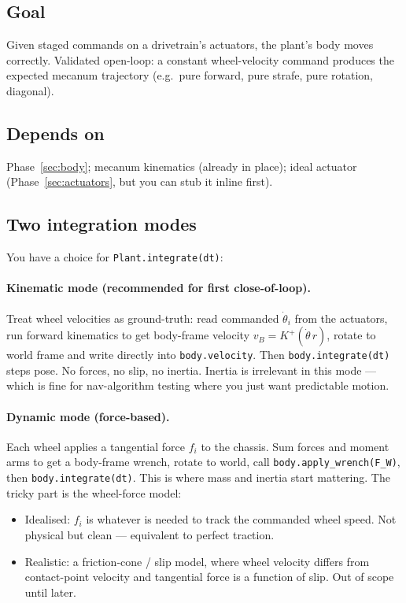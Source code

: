 \documentclass[11pt,a4paper]{article}
\newcommand{\code}[1]{\texttt{\small #1}}
\begin{document}
\subsection*{Goal}
Given staged commands on a drivetrain's actuators, the plant's body moves
correctly. Validated open-loop: a constant wheel-velocity command produces
the expected mecanum trajectory (e.g.\ pure forward, pure strafe, pure
rotation, diagonal).

\subsection*{Depends on}
Phase~\ref{sec:body}; mecanum kinematics (already in place); ideal actuator
(Phase~\ref{sec:actuators}, but you can stub it inline first).

\subsection*{Two integration modes}

You have a choice for \code{Plant.integrate(dt)}:

\paragraph{Kinematic mode (recommended for first close-of-loop).}
Treat wheel velocities as ground-truth: read commanded $\dot\theta_i$ from
the actuators, run forward kinematics to get body-frame velocity
$v_B = K^+ (\dot\theta\, r)$, rotate to world frame and write directly into
\code{body.velocity}. Then \code{body.integrate(dt)} steps pose. No forces,
no slip, no inertia. Inertia is irrelevant in this mode --- which is fine
for nav-algorithm testing where you just want predictable motion.

\paragraph{Dynamic mode (force-based).}
Each wheel applies a tangential force $f_i$ to the chassis. Sum forces and
moment arms to get a body-frame wrench, rotate to world, call
\code{body.apply\_wrench(F\_W)}, then \code{body.integrate(dt)}. This is
where mass and inertia start mattering. The tricky part is the wheel-force
model:
\begin{itemize}
    \item Idealised: $f_i$ is whatever is needed to track the commanded
        wheel speed. Not physical but clean --- equivalent to perfect
        traction.
    \item Realistic: a friction-cone / slip model, where wheel velocity
        differs from contact-point velocity and tangential force is a
        function of slip. Out of scope until later.
\end{itemize}
\end{document}
